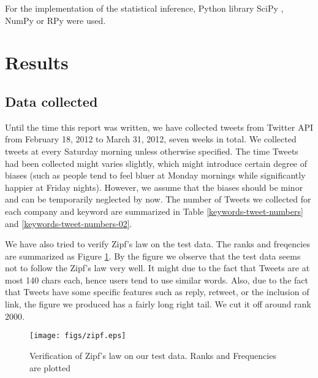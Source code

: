 \documentclass[12pt]{article}
\begin{document}
For the implementation of the statistical inference, Python library SciPy \cite{SciPy}, NumPy \cite{NumPy} or RPy \cite{RPy} were used.

\section{Results}

\subsection{Data collected}
Until the time this report was written, we have collected tweets from Twitter API from February 18, 2012 to March 31, 2012, seven weeks in total. We collected tweets at every Saturday morning unless otherwise specified. The time Tweets had been collected might varies slightly, which might introduce certain degree of biases (such as people tend to feel bluer at Monday mornings while significantly happier at Friday nights). However, we assume that the biases should be minor and can be temporarily neglected by now. The number of Tweets we collected for each company and keyword are summarized in Table \ref{keywords-tweet-numbers} and \ref{keywords-tweet-numbers-02}.

We have also tried to verify Zipf's law on the test data. The ranks and freqencies are summarized as Figure \ref{rank-freq}. By the figure we observe that the test data seems not to follow the Zipf's law very well. It might due to the fact that Tweets are at most 140 chars each, hence users tend to use similar words. Also, due to the fact that Tweets have some specific features such as reply, retweet, or the inclusion of link, the figure we produced has a fairly long right tail. We cut it off around rank $2000$.

\begin{figure}
\centering
    \texttt{[image: figs/zipf.eps]}
\caption{Verification of Zipf's law on our test data. Ranks and Frequencies are plotted}
\label{rank-freq}
\end{figure}
\end{document}
